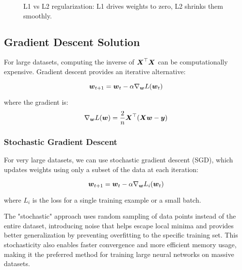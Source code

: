 \begin{figure}[htbp]
\centering
{}
\caption{L1 vs L2 regularization: L1 drives weights to zero, L2 shrinks them smoothly.}
\label{fig:regularization-comparison}
\end{figure}

\subsection{Gradient Descent Solution}

For large datasets, computing the inverse of $\boldsymbol{X}^\top \boldsymbol{X}$ can be computationally expensive. Gradient descent provides an iterative alternative:

\begin{equation}
\boldsymbol{w}_{t+1} = \boldsymbol{w}_t - \alpha \nabla_{\boldsymbol{w}} L(\boldsymbol{w}_t)
\end{equation}

where the gradient is:
\begin{equation}
\nabla_{\boldsymbol{w}} L(\boldsymbol{w}) = \frac{2}{n} \boldsymbol{X}^\top (\boldsymbol{X}\boldsymbol{w} - \boldsymbol{y})
\end{equation}

\subsubsection{Stochastic Gradient Descent}

For very large datasets, we can use stochastic gradient descent (SGD), which updates weights using only a subset of the data at each iteration:

\begin{equation}
\boldsymbol{w}_{t+1} = \boldsymbol{w}_t - \alpha \nabla_{\boldsymbol{w}} L_i(\boldsymbol{w}_t)
\end{equation}

where $L_i$ is the loss for a single training example or a small batch.

\begin{remark}
The "stochastic" approach uses random sampling of data points instead of the entire dataset, introducing noise that helps escape local minima and provides better generalization by preventing overfitting to the specific training set. This stochasticity also enables faster convergence and more efficient memory usage, making it the preferred method for training large neural networks on massive datasets.
\end{remark}

